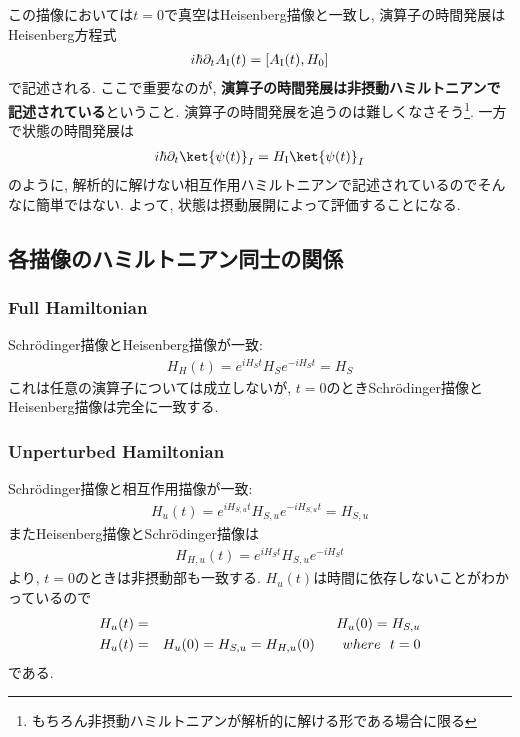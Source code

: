 この描像においては$t = 0$で真空はHeisenberg描像と一致し, 演算子の時間発展はHeisenberg方程式
\begin{eqnarray}
  i\hbar\partial_tA_{\rm I}(t) = [A_{\rm I}(t), H_0]
\end{eqnarray}
で記述される. ここで重要なのが, \textbf{演算子の時間発展は非摂動ハミルトニアンで記述されている}ということ. 演算子の時間発展を追うのは難しくなさそう\footnote{もちろん非摂動ハミルトニアンが解析的に解ける形である場合に限る}. 一方で状態の時間発展は
\begin{eqnarray}
  i\hbar\partial_t\ket{\psi(t)}_I = H_{\rm I}\ket{\psi(t)}_I
\end{eqnarray}
のように, 解析的に解けない相互作用ハミルトニアンで記述されているのでそんなに簡単ではない. よって, 状態は摂動展開によって評価することになる.
\subsection{各描像のハミルトニアン同士の関係}
\subsubsection{Full Hamiltonian}
Schr\"odinger描像とHeisenberg描像が一致:
\begin{eqnarray}
  H_H(t) = e^{iH_St}H_Se^{-iH_St} = H_S
\end{eqnarray}
これは任意の演算子については成立しないが, $t = 0$のときSchr\"odinger描像とHeisenberg描像は完全に一致する.
\subsubsection{Unperturbed Hamiltonian}
Schr\"odinger描像と相互作用描像が一致:
\begin{eqnarray}
  H_u(t) = e^{iH_{S, u}t}H_{S, u}e^{-iH_{S, u}t} = H_{S, u}
\end{eqnarray}
またHeisenberg描像とSchr\"odinger描像は
\begin{eqnarray}
  H_{H, u}(t) = e^{iH_St}H_{S, u}e^{-iH_St}
\end{eqnarray}
より, $t = 0$のときは非摂動部も一致する. $H_u(t)$は時間に依存しないことがわかっているので
\begin{eqnarray}
  H_u(t) &=& H_u(0) = H_{S, u}\\
  H_u(t) &=& H_u(0) = H_{S, u} = H_{H, u}(0)\hspace{0.7cm} where\ \ t = 0
\end{eqnarray}
である.
